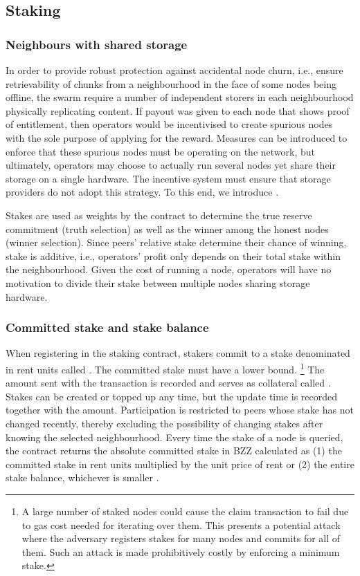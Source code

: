 \subsection{Staking}\label{sec:staking}

\subsubsection{Neighbours with shared storage}

In order to provide robust protection against accidental node churn, i.e., ensure retrievability of chunks from a neighbourhood in the face of some nodes being offline, the swarm require a number of independent storers in each neighbourhood physically replicating content.
If payout was given to each node that shows proof of entitlement, then operators would be incentivised to create spurious nodes with the sole purpose of applying for the reward. Measures can be introduced to enforce that these spurious nodes must be operating on the network, but ultimately, operators may choose to actually run several nodes yet share their storage on a single hardware. 
The incentive system must ensure that storage providers do not  adopt this strategy. To this end, we introduce .  

Stakes are used as weights by the contract to determine the true reserve commitment (truth selection) as well as the winner among the honest nodes (winner selection). Since peers' relative stake determine their chance of winning, stake is additive, i.e., operators' profit only depends on their total stake within the neighbourhood. Given the cost of running a node, operators will have no  motivation to divide their stake between multiple nodes sharing storage hardware.



\subsubsection{Committed stake and stake balance}

When registering in the staking contract, stakers commit to a stake denominated in rent units called 
.  The committed stake must have a lower bound.%
%
\footnote{A large number of staked nodes could cause the claim transaction to fail due to gas cost needed for iterating over them. This presents a potential attack where the adversary registers stakes for many nodes and commits for all of them. Such an attack is made prohibitively costly by enforcing a minimum stake.}
%
The  amount sent with the transaction is recorded and serves as collateral called . Stakes can be created or topped up any time, but the update time is recorded together with the amount.
Participation is restricted to peers whose stake has not changed recently, thereby excluding the possibility of changing stakes after knowing the selected neighbourhood.
Every time the stake of a node is queried, the contract returns  the  absolute committed stake in BZZ calculated as (1) the committed stake in rent units multiplied by the unit price of rent  or (2) the entire stake balance, whichever is smaller%
.  

